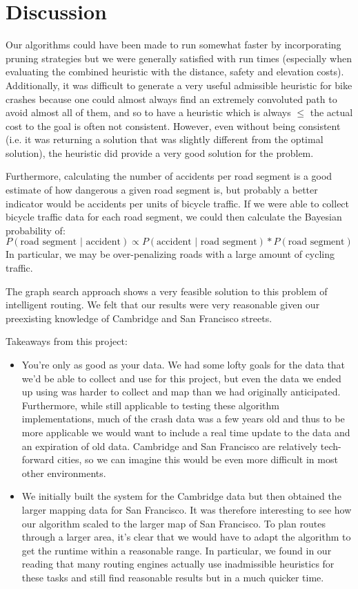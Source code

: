 \documentclass[11pt]{article}
\begin{document}
\section{Discussion}

Our algorithms could have been made to run somewhat faster by incorporating pruning strategies but we were generally satisfied with run times (especially when evaluating the combined heuristic with the distance, safety and elevation costs). Additionally, it was difficult to generate a very useful admissible heuristic for bike crashes because one could almost always find an extremely convoluted path to avoid almost all of them, and so to have a heuristic which is always $\le$ the actual cost to the goal is often not consistent. However, even without being consistent (i.e. it was returning a solution that was slightly different from the optimal solution), the heuristic did provide a very good solution for the problem.
\par
Furthermore, calculating the number of accidents per road segment is a good estimate of how dangerous a given road segment is, but probably a better indicator would be accidents per units of bicycle traffic. If we were able to collect bicycle traffic data for each road segment, we could then calculate the Bayesian probability of:
\begin{equation}
P(\text{road segment | accident}) \propto P(\text{accident | road segment}) * P(\text{road segment})
\end{equation}In particular, we may be over-penalizing roads with a large amount of cycling traffic.
\par
The graph search approach shows a very feasible solution to this problem of intelligent routing. We felt that our results were very reasonable given our preexisting knowledge of Cambridge and San Francisco streets.
\par
\noindent Takeaways from this project:
\begin{itemize}
\item You're only as good as your data. We had some lofty goals for the data that we'd be able to collect and use for this project, but even the data we ended up using was harder to collect and map than we had originally anticipated. Furthermore, while still applicable to testing these algorithm implementations, much of the crash data was a few years old and thus to be more applicable we would want to include a real time update to the data and an expiration of old data. Cambridge and San Francisco are relatively tech-forward cities, so we can imagine this would be even more difficult in most other environments.
\item We initially built the system for the Cambridge data but then obtained the larger mapping data for San Francisco. It was therefore interesting to see how our algorithm scaled to the larger map of San Francisco. To plan routes through a larger area, it's clear that we would have to adapt the algorithm to get the runtime within a reasonable range. In particular, we found in our reading that many routing engines actually use inadmissible heuristics for these tasks and still find reasonable results but in a much quicker time.
\end{itemize}
\end{document}

